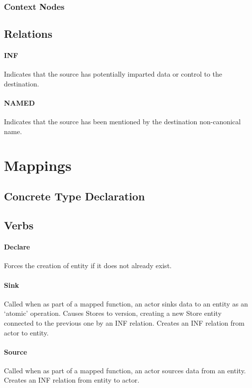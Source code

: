 \documentclass[12pt,twoside,openright,a4paper]{article}
\begin{document}
\subsubsection{Context Nodes}

\subsection{Relations}

\paragraph{INF}
Indicates that the source has potentially imparted data or control to the destination.

\paragraph{NAMED}
Indicates that the source has been mentioned by the destination non-canonical name.

\section{Mappings}

\subsection{Concrete Type Declaration}

\subsection{Verbs}

\paragraph{Declare}
Forces the creation of entity if it does not already exist.

\paragraph{Sink}
Called when as part of a mapped function, an actor sinks data to an entity as an ‘atomic’ operation.
Causes Stores to version, creating a new Store entity connected to the previous one by an INF relation.
Creates an INF relation from actor to entity. 

\paragraph{Source}
Called when as part of a mapped function, an actor sources data from an entity.
Creates an INF relation from entity to actor.
\end{document}
